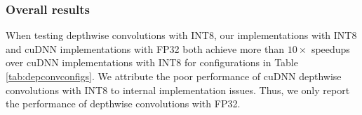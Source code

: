 
\subsubsection{Overall results}
When testing depthwise convolutions with INT8, our implementations with INT8 and cuDNN implementations with FP32 both achieve more than $10\times$ speedups over cuDNN implementations with INT8 for configurations in Table \ref{tab:depconvconfigs}.
We attribute the poor performance of cuDNN depthwise convolutions with INT8 to internal implementation issues.
Thus, we only report the performance of depthwise convolutions with FP32.

